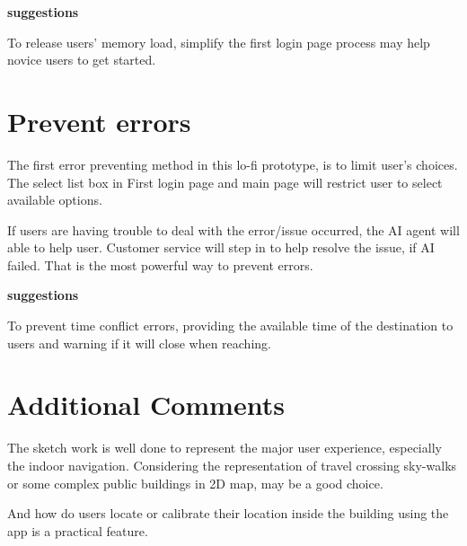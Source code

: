 \documentclass{article}
\begin{document}
		\textbf{suggestions}
	
	To release users' memory load, simplify the first login page process may help novice users to get started.
	
	\section{Prevent errors}
	
	The first error preventing method in this lo-fi prototype, is to limit user's choices. The select list box in First login page and main page will restrict user to select available options. 
	
	If users are having trouble to deal with the error/issue occurred, the AI agent will able to help user.
	Customer service will step in to help resolve the issue, if AI failed. That is the most powerful way to prevent errors.
	
		\textbf{suggestions}
	
	To prevent time conflict errors, providing the available time of the destination to users and warning if it will close when reaching.
	
	\section{Additional Comments}
	
	The sketch work is well done to represent the major user experience, especially the indoor navigation.
	Considering the representation of travel crossing sky-walks or some complex public buildings in 2D map,
	may be a good choice.
	
	And how do users locate or calibrate their location inside the building using the app is a practical feature.
	
\end{document}
